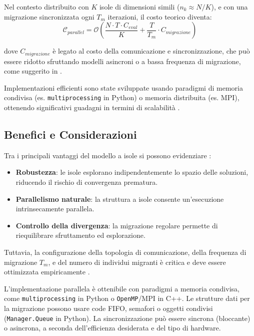 \documentclass{article}
\begin{document}
Nel contesto distribuito con $K$ isole di dimensioni simili ($n_k \approx N/K$), e con una migrazione 
sincronizzata ogni $T_m$ iterazioni, il costo teorico diventa:
\begin{equation}
\mathcal{C}_{parallel} = \mathcal{O}\left(\frac{N \cdot T \cdot C_{eval}}{K} + \frac{T}{T_m} \cdot C_{migrazione}\right)
\end{equation}

dove $C_{migrazione}$ è legato al costo della comunicazione e sincronizzazione, che può essere ridotto 
sfruttando modelli asincroni o a bassa frequenza di migrazione, come suggerito in \cite{cantupaz1998survey}.

Implementazioni efficienti sono state sviluppate usando paradigmi di memoria condivisa 
(es. \texttt{multiprocessing} in Python) o memoria distribuita (es. MPI), ottenendo significativi guadagni in 
termini di scalabilità \cite{alba2002parallelism, li2019openbox}.

\subsection{Benefici e Considerazioni}

Tra i principali vantaggi del modello a isole si possono evidenziare \cite{cantupaz1998survey, tomassini2005spatially}:

\begin{itemize}
    \item \textbf{Robustezza}: le isole esplorano indipendentemente lo spazio delle soluzioni, riducendo il rischio di convergenza prematura.
    \item \textbf{Parallelismo naturale}: la struttura a isole consente un'esecuzione intrinsecamente parallela.
    \item \textbf{Controllo della divergenza}: la migrazione regolare permette di riequilibrare sfruttamento ed esplorazione.
\end{itemize}

Tuttavia, la configurazione della topologia di comunicazione, della frequenza di migrazione $T_m$, e del 
numero di individui migranti è critica e deve essere ottimizzata empiricamente \cite{alba2002parallelism}.

L'implementazione parallela è ottenibile con paradigmi a memoria condivisa, come 
\texttt{multiprocessing} in Python o \texttt{OpenMP}/MPI in C++. Le strutture dati per la migrazione 
possono usare code FIFO, semafori o oggetti condivisi (\texttt{Manager.Queue} in Python). 
La sincronizzazione può essere sincrona (bloccante) o asincrona, a seconda dell’efficienza desiderata e 
del tipo di hardware.
\end{document}
